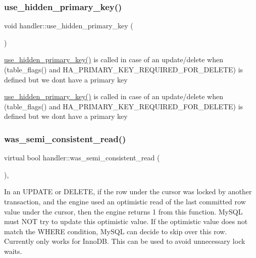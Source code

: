 \subsubsection{\texorpdfstring{use\+\_\+hidden\+\_\+primary\+\_\+key()}{use\_hidden\_primary\_key()}}
{\footnotesize\ttfamily void handler\+::use\+\_\+hidden\+\_\+primary\+\_\+key (\begin{DoxyParamCaption}{ }\end{DoxyParamCaption})\hspace{0.3cm}{\ttfamily [virtual]}}



\mbox{\hyperlink{classhandler_adac21f2d10c4463fb1d7e14882c6314f}{use\+\_\+hidden\+\_\+primary\+\_\+key()}} is called in case of an update/delete when (table\+\_\+flags() and H\+A\+\_\+\+P\+R\+I\+M\+A\+R\+Y\+\_\+\+K\+E\+Y\+\_\+\+R\+E\+Q\+U\+I\+R\+E\+D\+\_\+\+F\+O\+R\+\_\+\+D\+E\+L\+E\+TE) is defined but we don\textquotesingle{}t have a primary key 

\mbox{\hyperlink{classhandler_adac21f2d10c4463fb1d7e14882c6314f}{use\+\_\+hidden\+\_\+primary\+\_\+key()}} is called in case of an update/delete when (table\+\_\+flags() and H\+A\+\_\+\+P\+R\+I\+M\+A\+R\+Y\+\_\+\+K\+E\+Y\+\_\+\+R\+E\+Q\+U\+I\+R\+E\+D\+\_\+\+F\+O\+R\+\_\+\+D\+E\+L\+E\+TE) is defined but we don\textquotesingle{}t have a primary key \mbox{\label{classhandler_a54d92f647a4ca5a3b7867fa5538242a6}} 
\subsubsection{\texorpdfstring{was\+\_\+semi\+\_\+consistent\+\_\+read()}{was\_semi\_consistent\_read()}}
{\footnotesize\ttfamily virtual bool handler\+::was\+\_\+semi\+\_\+consistent\+\_\+read (\begin{DoxyParamCaption}{ }\end{DoxyParamCaption})\hspace{0.3cm}{\ttfamily [inline]}, {\ttfamily [virtual]}}

In an U\+P\+D\+A\+TE or D\+E\+L\+E\+TE, if the row under the cursor was locked by another transaction, and the engine used an optimistic read of the last committed row value under the cursor, then the engine returns 1 from this function. My\+S\+QL must N\+OT try to update this optimistic value. If the optimistic value does not match the W\+H\+E\+RE condition, My\+S\+QL can decide to skip over this row. Currently only works for Inno\+DB. This can be used to avoid unnecessary lock waits.

